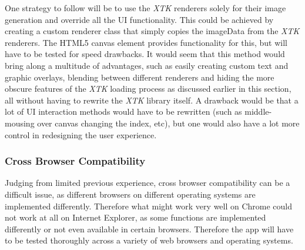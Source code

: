 \documentclass[a4paper,11pt,titlepage]{article}
\begin{document}
One strategy to follow will be to use the \textit{XTK} renderers solely for their image generation and override all the UI functionality. This could be achieved by creating a custom renderer class that simply copies the imageData from the \textit{XTK} renderers. The HTML5 canvas element provides functionality for this, but will have to be tested for speed drawbacks. It would seem that this method would bring along a multitude of advantages, such as easily creating custom text and graphic overlays, blending between different renderers and hiding the more obscure features of the \textit{XTK} loading process as discussed earlier in this section, all without having to rewrite the \textit{XTK} library itself. A drawback would be that a lot of UI interaction methods would have to be rewritten (such as middle-mousing over canvas changing the index, etc), but one would also have a lot more control in redesigning the user experience.

\subsubsection{Cross Browser Compatibility}

Judging from limited previous experience, cross browser compatibility can be a difficult issue, as different browsers on different operating systems are implemented differently. Therefore what might work very well on Chrome could not work at all on Internet Explorer, as some functions are implemented differently or not even available in certain browsers. Therefore the app will have to be tested thoroughly across a variety of web browsers and operating systems.


\newpage
\end{document}
